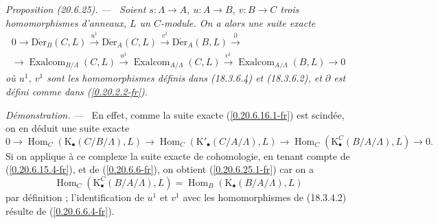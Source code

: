 \documentclass[10pt,oneside]{book}
\makeatletter
\newcommand{\sref}[1]{(\ref{#1})}
\newcommand{\setmanualcurrentlabel}[1]{\def\@currentlabel{#1}}
\newenvironment{proposition}[1][]{%
  \setmanualcurrentlabel{#1}\par\medskip\noindent\itshape Proposition (#1). ---\ }{\par}
\newenvironment{proof}{%
  \par\medskip\noindent\textit{Démonstration. ---\ }}{\par}
\makeatother
\begin{document}
\begin{proposition}[20.6.25]
\label{0.20.6.25-fr}
Soient $s:\Lambda\to A$, $u:A\to B$, $v:B\to C$ trois homomorphismes
d'anneaux, $L$ un $C$-module. On a alors une suite exacte
\begin{equation}
\tag{20.6.25.1}
\label{0.20.6.25.1-fr}
\begin{split}
  0\to\operatorname{D\acute{e}r}_B(C,L)\xrightarrow{u^1}
  \operatorname{D\acute{e}r}_A(C,L)\xrightarrow{v^1}
  \operatorname{D\acute{e}r}_A(B,L)\xrightarrow{\partial} \\
  \to\operatorname{Exalcom}_{B/\Lambda}(C,L)\xrightarrow{u^1}
  \operatorname{Exalcom}_{A/\Lambda}(C,L)\xrightarrow{v^1}
  \operatorname{Exalcom}_{A/\Lambda}(B,L)\to0
\end{split}
\end{equation}
où $u^1$, $v^1$ sont les homomorphismes définis dans (18.3.6.4) et
(18.3.6.2), et $\partial$ est défini comme dans \sref{0.20.2.2-fr}.
\end{proposition}

\begin{proof}
En effet, comme la suite exacte \sref{0.20.6.16.1-fr} est scindée, on en
déduit une suite exacte
\[
  0\to\operatorname{Hom}_C(\mathrm{K}_\bullet(C/B/\Lambda),L)\to
  \operatorname{Hom}_C(\mathrm{K}'_\bullet(C/A/\Lambda),L)\to
  \operatorname{Hom}_C(\mathrm{K}^C_\bullet(B/A/\Lambda),L)\to0.
\]
Si on applique à ce complexe la suite exacte de cohomologie, en tenant compte
de \sref{0.20.6.15.4-fr}, et de \sref{0.20.6.6-fr}, on obtient
\sref{0.20.6.25.1-fr} car on a
\[
  \operatorname{Hom}_C(\mathrm{K}^C_\bullet(B/A/\Lambda),L)
  =\operatorname{Hom}_B(\mathrm{K}_\bullet(B/A/\Lambda),L)
\]
par définition ; l'identification de $u^1$ et $v^1$ avec les homomorphismes
de (18.3.4.2) résulte de \sref{0.20.6.6.4-fr}.
\end{proof}
\end{document}
